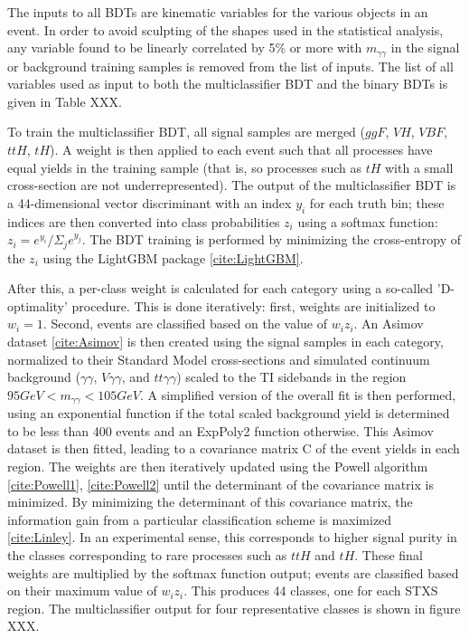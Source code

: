 The inputs to all BDTs are kinematic variables for the various objects in an event. In order to avoid sculpting of the shapes used in the statistical analysis, any variable found to be linearly correlated by 5\% or more with $m_{\gamma \gamma}$ in the signal or background training samples is removed from the list of inputs. The list of all variables used as input to both the multiclassifier BDT and the binary BDTs is given in Table XXX.

To train the multiclassifier BDT, all signal samples are merged ($ggF$, $VH$, $VBF$, $ttH$, $tH$). A weight is then applied to each event such that all processes have equal yields in the training sample (that is, so processes such as $tH$ with a small cross-section are not underrepresented). The output of the multiclassifier BDT is a 44-dimensional vector discriminant with an index $y_{i}$ for each truth bin; these indices are then converted into class probabilities $z_{i}$ using a softmax function: $z_{i} = e^{y_{i}}/{\Sigma_{j}e^{y_{j}}}$. The BDT training is performed by minimizing the cross-entropy of the $z_{i}$ using the LightGBM package \ref{cite:LightGBM}.

After this, a per-class weight is calculated for each category using a so-called 'D-optimality' procedure. This is done iteratively: first, weights are initialized to $w_{i} = 1$. Second, events are classified based on the value of $w_{i}z_{i}$. An Asimov dataset \ref{cite:Asimov} is then created using the signal samples in each category, normalized to their Standard Model cross-sections and simulated continuum background ($\gamma\gamma$, $V\gamma\gamma$, and $tt\gamma\gamma$) scaled to the TI sidebands in the region $95 GeV < m_{\gamma \gamma} < 105 GeV$. A simplified version of the overall fit is then performed, using an exponential function if the total scaled background yield is determined to be less than 400 events and an ExpPoly2 function otherwise. This Asimov dataset is then fitted, leading to a covariance matrix C of the event yields in each region. The weights are then iteratively updated using the Powell algorithm \ref{cite:Powell1}, \ref{cite:Powell2} until the determinant of the covariance matrix is minimized. By minimizing the determinant of this covariance matrix, the information gain from a particular classification scheme is maximized \ref{cite:Linley}. In an experimental sense, this corresponds to higher signal purity in the classes corresponding to rare processes such as $ttH$ and $tH$. These final weights are multiplied by the softmax function output; events are classified based on their maximum value of $w_{i}z_{i}$. This produces 44 classes, one for each STXS region. The multiclassifier output for four representative classes is shown in figure XXX.


